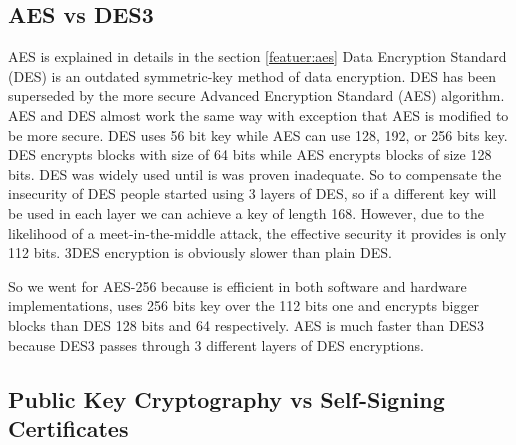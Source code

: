 \subsection{AES vs DES3}
AES is explained in details in the section \ref{featuer:aes}
Data Encryption Standard (DES) is an outdated symmetric-key method of data encryption. DES has been superseded by the more secure Advanced Encryption Standard (AES) algorithm. AES and DES almost work the same way with exception that AES is modified to be more secure. DES uses 56 bit key while AES can use 128, 192, or 256 bits key. DES encrypts blocks with size of 64 bits while AES encrypts blocks of size 128 bits. DES was widely used until is was proven inadequate. So to compensate the insecurity of DES people started using 3 layers of DES, so if a different key will be used in each layer we can achieve a key of length 168. However, due to the likelihood of a meet-in-the-middle attack, the effective security it provides is only 112 bits. 3DES encryption is obviously slower than plain DES.
\par So we went for AES-256 because  is efficient in both software and hardware implementations, uses 256 bits key over the 112 bits one and encrypts bigger blocks than DES 128 bits and 64 respectively. AES is much faster than DES3 because DES3 passes through 3 different layers of DES encryptions.

\subsection{Public Key Cryptography vs Self-Signing Certificates}